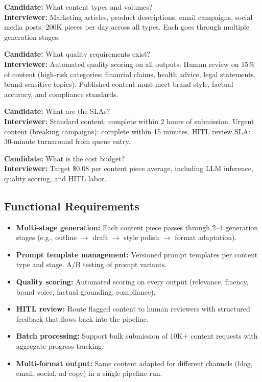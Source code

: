 \textbf{Candidate:} What content types and volumes?\\
\textbf{Interviewer:} Marketing articles, product descriptions, email campaigns, social media posts. 200K pieces per day across all types. Each goes through multiple generation stages.

\textbf{Candidate:} What quality requirements exist?\\
\textbf{Interviewer:} Automated quality scoring on all outputs. Human review on 15\% of content (high-risk categories: financial claims, health advice, legal statements, brand-sensitive topics). Published content must meet brand style, factual accuracy, and compliance standards.

\textbf{Candidate:} What are the SLAs?\\
\textbf{Interviewer:} Standard content: complete within 2 hours of submission. Urgent content (breaking campaigns): complete within 15 minutes. HITL review SLA: 30-minute turnaround from queue entry.

\textbf{Candidate:} What is the cost budget?\\
\textbf{Interviewer:} Target \$0.08 per content piece average, including LLM inference, quality scoring, and HITL labor.

\subsection*{Functional Requirements}

\begin{itemize}
  \item \textbf{Multi-stage generation:} Each content piece passes through 2--4 generation stages (e.g., outline $\rightarrow$ draft $\rightarrow$ style polish $\rightarrow$ format adaptation).
  \item \textbf{Prompt template management:} Versioned prompt templates per content type and stage. A/B testing of prompt variants.
  \item \textbf{Quality scoring:} Automated scoring on every output (relevance, fluency, brand voice, factual grounding, compliance).
  \item \textbf{HITL review:} Route flagged content to human reviewers with structured feedback that flows back into the pipeline.
  \item \textbf{Batch processing:} Support bulk submission of 10K+ content requests with aggregate progress tracking.
  \item \textbf{Multi-format output:} Same content adapted for different channels (blog, email, social, ad copy) in a single pipeline run.
\end{itemize}

